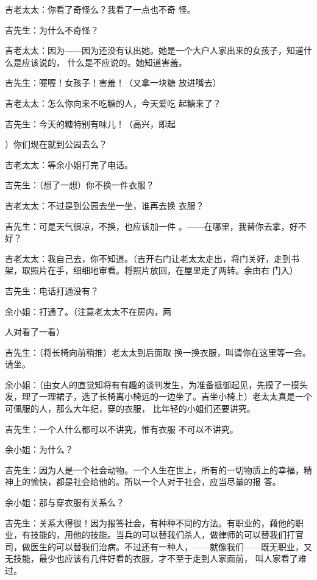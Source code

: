 \documentclass{article}
\begin{document}
吉老太太：你看了奇怪么？我看了一点也不奇
怪。 


吉先生：为什么不奇怪？ 

吉老太太：因为——因为还没有认出她。她是一个大户人家出来的女孩子，知道什么是应该说的，
什么是不应说的。她知道害羞。 

吉先生：喔喔！女孩子！害羞！（又拿一块糖
放进嘴去） 

吉老太太：怎么你向来不吃糖的人，今天爱吃
起糖来了？ 

吉先生：今天的糖特别有味儿！（高兴，即起
\newpage

）你们现在就到公园去么？ 



吉老太太：等余小姐打完了电话。 


吉先生：（想了一想）你不换一件衣服？ 

吉老太太：不过是到公园去坐一坐，谁再去换
衣服？ 

吉先生：可是天气很凉，不换，也应该加一件
。——在哪里，我替你去拿，好不好？ 

吉老太太：我自己去，你不知道。（吉开右门让老太太走出，将门关好，走到书架，取照片在手，细细地审看。将照片放回，在屋里走了两转。余由右
门入） 


吉先生：电话打通没有？ 

余小姐：打通了。（注意老太太不在房内，两
\newpage

人对看了一看） 

吉先生：（将长椅向前稍推）老太太到后面取
换一换衣服，叫请你在这里等一会。请坐。 

余小姐：（由女人的直觉知将有有趣的谈判发生，为准备抵御起见，先摸了一摸头发，理了一理裙子，选了长椅离小椅远的一边坐了。吉坐小椅上）老太太真是一个可佩服的人，那么大年纪，穿的衣服，
比年轻的小姐们还要讲究。 

吉先生：一个人什么都可以不讲究，惟有衣服
不可以不讲究。 


余小姐：为什么？ 

吉先生：因为人是一个社会动物。一个人生在世上，所有的一切物质上的幸福，精神上的愉快，都是社会给他的。所以一个人对于社会，应当尽量的报
答。 

\newpage


余小姐：那与穿衣服有关系么？ 

吉先生：关系大得很！因为报答社会，有种种不同的方法。有职业的，藉他的职业，有技能的，用他的技能。当兵的可以替我们杀人，做律师的可以替我们打官司，做医生的可以替我们治病。不过还有一种人，——就像我们——既无职业，又无技能，最少也应该有几件好看的衣服，才不至于走到人家面前，
叫人家看了难过。 
\end{document}
